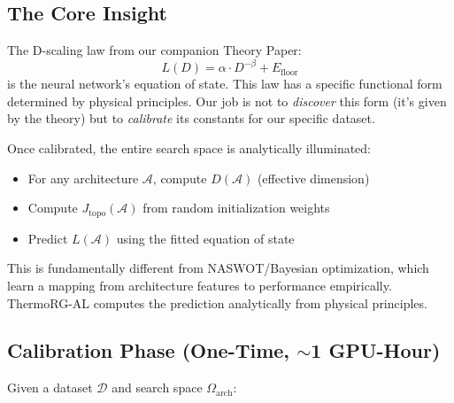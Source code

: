 \documentclass[11pt, a4paper]{article}
\theoremstyle{plain}
\begin{document}
\subsection{The Core Insight}

The D-scaling law from our companion Theory Paper:
\begin{equation}
L(D) = \alpha \cdot D^{-\beta} + E_{\mathrm{floor}}
\end{equation}
is the neural network's equation of state. This law has a specific functional form determined by physical principles. Our job is not to \emph{discover} this form (it's given by the theory) but to \emph{calibrate} its constants for our specific dataset.

Once calibrated, the entire search space is analytically illuminated:
\begin{itemize}
\item For any architecture $\mathcal{A}$, compute $D(\mathcal{A})$ (effective dimension)
\item Compute $J_{\mathrm{topo}}(\mathcal{A})$ from random initialization weights
\item Predict $L(\mathcal{A})$ using the fitted equation of state
\end{itemize}

This is fundamentally different from NASWOT/Bayesian optimization, which learn a mapping from architecture features to performance empirically. ThermoRG-AL computes the prediction analytically from physical principles.

\subsection{Calibration Phase (One-Time, $\sim$1 GPU-Hour)}

Given a dataset $\mathcal{D}$ and search space $\Omega_{\mathrm{arch}}$:
\end{document}

